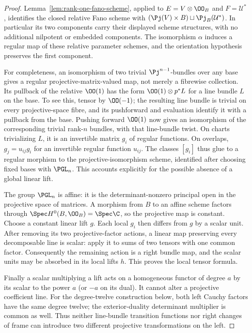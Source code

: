 \begin{proof}
Lemma~\ref{lem:rank-one-fano-scheme}, applied to
\(E=V\otimes\OO_B\) and \(F=\mathcal U^*\), identifies the
closed relative Fano scheme with
\((\Pj(V)\times B)\sqcup\Pj_B(\mathcal U^*)\).
In particular its two components carry their displayed scheme structures,
with no additional nilpotent or embedded components.
The isomorphism \(\alpha\) induces a regular map of these relative
parameter schemes, and the orientation hypothesis preserves the
first component.

For completeness, an isomorphism of two trivial \(\Pj^{n-1}\)-bundles
over any base gives a regular projective-matrix-valued map, not
merely a fibrewise collection.  Its pullback of the relative
\(\OO(1)\) has the form \(\OO(1)\otimes p^*L\) for a line
bundle \(L\) on the base.  To see this, tensor by \(\OO(-1)\);
the resulting line bundle is trivial on every projective-space
fibre, and its pushforward and evaluation identify it with a
pullback from the base.  Pushing forward \(\OO(1)\) now gives
an isomorphism of the corresponding trivial rank-\(n\) bundles,
with that line-bundle twist.  On charts trivializing \(L\), it
is an invertible matrix \(g_i\) of regular functions.  On overlaps,
\(g_j=u_{ij}g_i\) for an invertible regular function \(u_{ij}\).
The classes \([g_i]\) thus glue to a regular morphism to the
projective-isomorphism scheme, identified after choosing fixed
bases with \(\PGL_n\).  This accounts explicitly for the possible
absence of a global linear lift.

The group \(\PGL_n\) is affine: it is the determinant-nonzero
principal open in the projective space of matrices.  A morphism
from \(B\) to an affine scheme factors through
\(\Spec H^0(B,\OO_B)=\Spec\C\), so the projective map is constant.
Choose a constant linear lift \(g\).  Each local \(g_i\) then
differs from \(g\) by a scalar unit.  After removing its two
projective-factor actions, a linear map preserving every
decomposable line is scalar: apply it to sums of two tensors with
one common factor.  Consequently the remaining action is a right
bundle map, and the scalar units may be absorbed in its local
lifts \(h\).  This proves the local tensor formula.

Finally a scalar multiplying a lift acts on a homogeneous functor
of degree \(a\) by its scalar to the power \(a\) (or \(-a\)
on its dual).  It cannot alter a projective coefficient line.
For the degree-twelve construction below, both left Cauchy factors
have the same degree twelve; the exterior-duality determinant
multiplier is common as well.  Thus neither line-bundle transition
functions nor right changes of frame can introduce two different
projective transformations on the left.
\end{proof}

